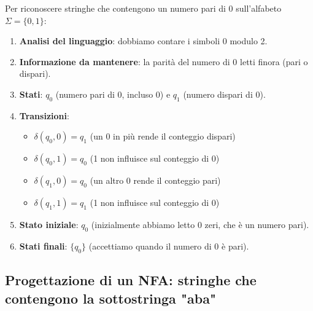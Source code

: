 \documentclass[12pt,a4paper]{article}
\begin{document}
\begin{risoluzione}
Per riconoscere stringhe che contengono un numero pari di 0 sull'alfabeto $\Sigma = \{0, 1\}$:

\begin{enumerate}
  \item \textbf{Analisi del linguaggio}: dobbiamo contare i simboli 0 modulo 2.
  \item \textbf{Informazione da mantenere}: la parità del numero di 0 letti finora (pari o dispari).
  \item \textbf{Stati}: $q_0$ (numero pari di 0, incluso 0) e $q_1$ (numero dispari di 0).
  \item \textbf{Transizioni}:
    \begin{itemize}
      \item $\delta(q_0, 0) = q_1$ (un 0 in più rende il conteggio dispari)
      \item $\delta(q_0, 1) = q_0$ (1 non influisce sul conteggio di 0)
      \item $\delta(q_1, 0) = q_0$ (un altro 0 rende il conteggio pari)
      \item $\delta(q_1, 1) = q_1$ (1 non influisce sul conteggio di 0)
    \end{itemize}
  \item \textbf{Stato iniziale}: $q_0$ (inizialmente abbiamo letto 0 zeri, che è un numero pari).
  \item \textbf{Stati finali}: $\{q_0\}$ (accettiamo quando il numero di 0 è pari).
\end{enumerate}

\begin{figure}[h]
\centering
{}
\end{figure}
\end{risoluzione}

\subsection{Progettazione di un NFA: stringhe che contengono la sottostringa "aba"}
\end{document}
